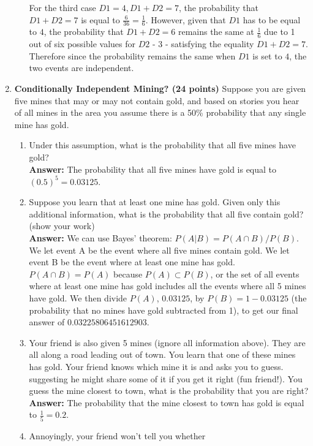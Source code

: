\documentclass[12pt, letterpaper, twoside]{article}
\begin{document}
\begin{enumerate}
\begin{enumerate}
			For the third case $D1=4,D1+D2=7$, the probability that $D1+D2=7$ is
			equal to $\frac{6}{36}=\frac{1}{6}$. However, given that $D1$ has to
			be equal to $4$, the probability that $D1+D2=6$ remains the same at
			$\frac{1}{6}$ due to 1 out of six possible values for $D2$ - $3$ - satisfying
			the equality $D1 + D2 = 7$. Therefore since the probability remains the same
			when $D1$ is set to $4$, the two events are independent.
		\end{enumerate}
		\item \textbf{Conditionally Independent Mining? (24 points)}
		Suppose you are given five mines that may or may not contain
		gold, and based on stories you hear of all mines in the area
		you assume there is a 50\% probability that any single mine
		has gold.
		\begin{enumerate}
			\item Under this assumption, what is the probability that
			all five mines have gold?\\
			\textbf{Answer:} The probability that all five mines have gold
			is equal to $(0.5)^5=0.03125$.
			\item Suppose you learn that at least one mine has gold.
			Given only this additional information, what is the
			probability that all five contain gold? (show your work)\\
			\textbf{Answer:} We can use Bayes' theorem: $P(A|B)=P(A \cap B) / P(B)$.
			We let event A be the event where all five mines contain
			gold. We let event B be the event where at least one
			mine has gold. $P(A\cap B) = P(A)$ because $P(A)\subset P(B)$,
			or the set of all events where at least one mine has gold
			includes all the events where all 5 mines have gold.
			We then divide $P(A)$, $0.03125$, by $P(B)=1-0.03125$ (the probability
			that no mines have gold subtracted from 1), to get
			our final answer of $0.03225806451612903$.
			\item Your friend is also given 5 mines (ignore all
			information above). They are all along a road leading
			out of town. You learn that  one
			of these mines has gold.
			Your friend knows which mine it is and asks you to guess.
			suggesting he might share some of it if you get it right
			(fun friend!). You guess the mine closest to town,
			what is the probability that you are right?\\
			\textbf{Answer:} The probability that the mine closest
			to town has gold is equal to $\frac{1}{5}=0.2$.
			\item Annoyingly, your friend won’t tell you whether

\end{enumerate}
\end{enumerate}
\end{document}
